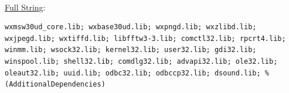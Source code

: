 \documentclass[12pt]{report}
\begin{document}
\begin{appendices}
\begin{itemize}
\begin{itemize}
\begin{itemize}
\begin{itemize}
						\\
						\underline{\scriptsize Full String}:
\begin{lstlisting}
wxmsw30ud_core.lib; wxbase30ud.lib; wxpngd.lib; wxzlibd.lib; wxjpegd.lib; wxtiffd.lib; libfftw3-3.lib; comctl32.lib; rpcrt4.lib; winmm.lib; wsock32.lib; kernel32.lib; user32.lib; gdi32.lib; winspool.lib; shell32.lib; comdlg32.lib; advapi32.lib; ole32.lib; oleaut32.lib; uuid.lib; odbc32.lib; odbccp32.lib; dsound.lib; %(AdditionalDependencies)
\end{lstlisting}
				\end{itemize}  %
			\end{itemize}  %
		\end{itemize} %
	\end{itemize} %
	\clearpage



\end{appendices}
\end{document}
